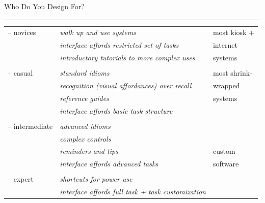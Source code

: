 \documentclass[pdf]{beamer}
\begin{document}
\begin{frame}
	{Who Do You Design For?}{\textcolor{red}{\rule{12cm}{1.2pt}}}
	
    \small
    \bigskip

    \hskip-0.5cm
    \setlength\tabcolsep{1.5pt}
   \begin{tabular}{ll@{}l}
    {--} novices     & \textit{walk up and use systems} & \scriptsize \color{red} most kiosk +  \\
             		 & \textit{interface affords restricted set of tasks} & \scriptsize \color{red} internet  \\
                     & \textit{introductory tutorials to more complex uses} & \scriptsize \color{red} systems \\ \\
                
    {--}  casual     & \textit{standard idioms}   & \scriptsize \color{red} \quad most shrink-\\
   					 & \textit{recognition (visual affordances) over recall}  & \scriptsize \color{red} \quad wrapped  \\
                     & \textit{reference guides}   & \scriptsize \color{red} \quad systems  \\
                     & \textit{interface affords basic task structure}    \\ \\
    {--}  intermediate     & \textit{advanced idioms}  \\
   					 & \textit{complex controls}    \\
                     & \textit{reminders and tips}   & \scriptsize \color{red} \qquad custom \\
                     & \textit{interface affords advanced tasks} & \scriptsize \color{red} \qquad software  \\ \\
    {--}  expert     & \textit{shortcuts for power use}     \\
             		 & \textit{interface affords full task + task customization}
   \end{tabular}


\end{frame}
\end{document}
